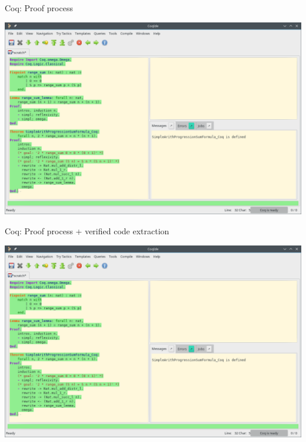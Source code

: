 \documentclass[aspectratio=169, 12pt, fleqn]{beamer}
\begin{document}
\begin{frame}[fragile]{Coq: Proof process}
\begin{center}
  \includegraphics[scale=0.38]{img/coq_arith_complete.png}
\end{center}
\end{frame}

\begin{frame}[fragile]{Coq: Proof process + verified code extraction}
\begin{center}
  \includegraphics[scale=0.38]{img/coq_arith_complete.png}
\end{center}
  \begin{figure}
  \end{figure}
\end{frame}
\end{document}
